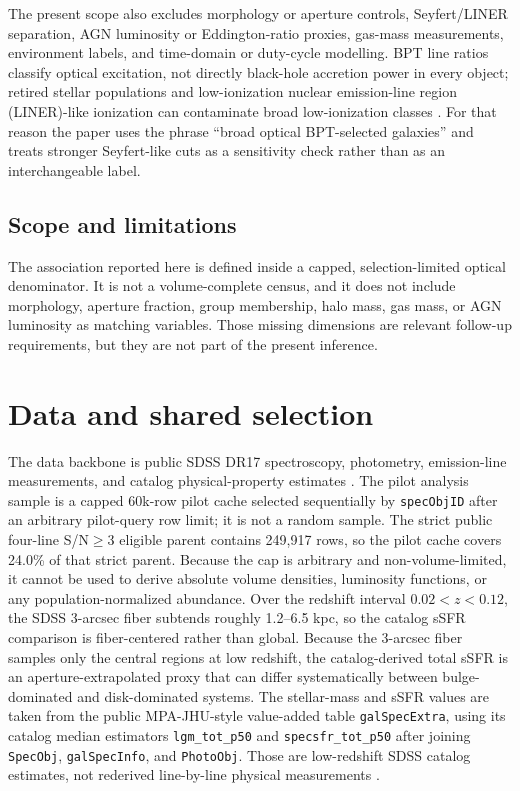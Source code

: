 \documentclass[twocolumn]{aastex631}
\begin{document}
The present scope also excludes morphology or aperture controls, Seyfert/LINER separation, AGN luminosity or Eddington-ratio proxies, gas-mass measurements, environment labels, and time-domain or duty-cycle modelling. BPT line ratios classify optical excitation, not directly black-hole accretion power in every object; retired stellar populations and low-ionization nuclear emission-line region (LINER)-like ionization can contaminate broad low-ionization classes \citep{stasinska2008,stasinska2015}. For that reason the paper uses the phrase ``broad optical BPT-selected galaxies'' and treats stronger Seyfert-like cuts as a sensitivity check rather than as an interchangeable label.

\subsection{Scope and limitations}
The association reported here is defined inside a capped, selection-limited optical denominator. It is not a volume-complete census, and it does not include morphology, aperture fraction, group membership, halo mass, gas mass, or AGN luminosity as matching variables. Those missing dimensions are relevant follow-up requirements, but they are not part of the present inference.

\section{Data and shared selection}
The data backbone is public SDSS DR17 spectroscopy, photometry, emission-line measurements, and catalog physical-property estimates \citep{york2000,sdssdr17,brinchmann2004}. The pilot analysis sample is a capped 60k-row pilot cache selected sequentially by \texttt{specObjID} after an arbitrary pilot-query row limit; it is not a random sample. The strict public four-line S/N$\geq3$ eligible parent contains 249,917 rows, so the pilot cache covers 24.0\% of that strict parent. Because the cap is arbitrary and non-volume-limited, it cannot be used to derive absolute volume densities, luminosity functions, or any population-normalized abundance.
Over the redshift interval $0.02<z<0.12$, the SDSS 3-arcsec fiber subtends roughly 1.2--6.5 kpc, so the catalog sSFR comparison is fiber-centered rather than global.
Because the 3-arcsec fiber samples only the central regions at low redshift, the catalog-derived total sSFR is an aperture-extrapolated proxy that can differ systematically between bulge-dominated and disk-dominated systems.
The stellar-mass and sSFR values are taken from the public MPA-JHU-style value-added table \texttt{galSpecExtra}, using its catalog median estimators \texttt{lgm\_tot\_p50} and \texttt{specsfr\_tot\_p50} after joining \texttt{SpecObj}, \texttt{galSpecInfo}, and \texttt{PhotoObj}. Those are low-redshift SDSS catalog estimates, not rederived line-by-line physical measurements \citep{brinchmann2004,sdssdr17,york2000}.
\end{document}
